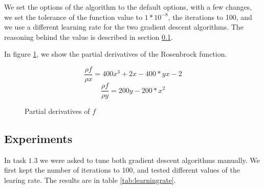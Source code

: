 \documentclass{article}
\begin{document}
We set the options of the algorithm to the default options, with a few changes, we set the tolerance of the function value to $1*10^{-8}$, the iterations to 100, and we use a different learning rate for the two gradient descent algorithms. The reasoning behind the value is described in section \ref{sec:experiments}.

In figure \ref{fig:partdiv}, we show the partial derivatives of the Rosenbrock function.
\begin{figure}[H]
    \[\frac{\rho f}{\rho x} = 400x^3 + 2x - 400*yx - 2\]
    \[\frac{\rho f}{\rho y} = 200y - 200*x^2\]
    \caption{Partial derivatives of $f$}
    \label{fig:partdiv}
\end{figure}



\subsection{Experiments}
\label{sec:experiments}
In task $1.3$ we were asked to tune both gradient descent algorithms manually. We first kept the number of iterations to 100, and tested different values of the learing rate. The results are in table \ref{tab:learningrate}.
\end{document}
